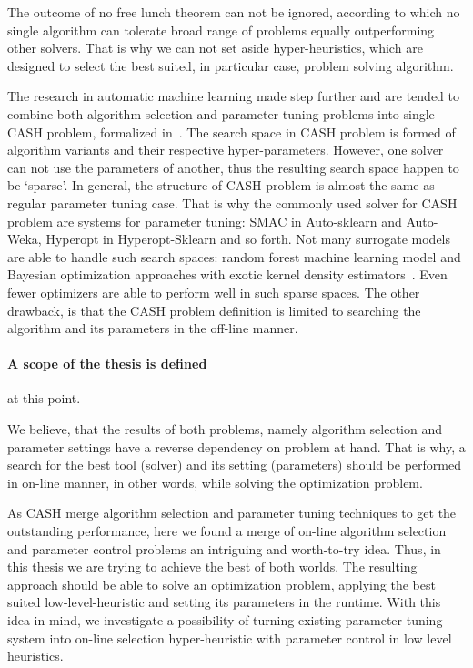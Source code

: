 The outcome of no free lunch theorem can not be ignored, according to which no single algorithm can tolerate broad range of problems equally outperforming other solvers. That is why we can not set aside hyper-heuristics, which are designed to select the best suited, in particular case, problem solving algorithm.

The research in automatic machine learning made step further and are tended to combine both algorithm selection and parameter tuning problems into single CASH problem, formalized in~\cite{thornton2013auto}. The search space in CASH problem is formed of algorithm variants and their respective hyper-parameters. However, one solver can not use the parameters of another, thus the resulting search space happen to be `sparse'. In general, the structure of CASH problem is almost the same as regular parameter tuning case. That is why the commonly used solver for CASH problem are systems for parameter tuning: SMAC in Auto-sklearn and Auto-Weka, Hyperopt in Hyperopt-Sklearn and so forth.
Not many surrogate models are able to handle such search spaces: random forest machine learning model and Bayesian optimization approaches with exotic kernel density estimators~\cite{levesque2017bayesian}. Even fewer optimizers are able to perform well in such sparse spaces.
The other drawback, is that the CASH problem definition is limited to searching the algorithm and its parameters in the off-line manner.

\paragraph{A scope of the thesis is defined} at this point.

We believe, that the results of both problems, namely algorithm selection and parameter settings have a reverse dependency on problem at hand.
That is why, a search for the best tool (solver) and its setting (parameters) should be performed in on-line manner, in other words, while solving the optimization problem.

As CASH merge algorithm selection and parameter tuning techniques to get the outstanding performance, here we found a merge of on-line algorithm selection and parameter control problems an intriguing and worth-to-try idea. 
Thus, in this thesis we are trying to achieve the best of both worlds. The resulting approach should be able to solve an optimization problem, applying the best suited low-level-heuristic and setting its parameters in the runtime. With this idea in mind, we investigate a possibility of turning existing parameter tuning system into on-line selection hyper-heuristic with parameter control in low level heuristics.
